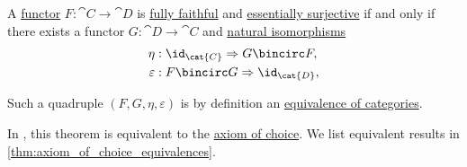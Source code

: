 \begin{theorem}\label{thm:categorical_equivalence_characterization}
  A \hyperref[def:functor]{functor} \( F: \cat{C} \to \cat{D} \) is \hyperref[def:functor_invertibility/fully_faithful]{fully faithful} and \hyperref[def:functor_invertibility/essentially_surjective]{essentially surjective} if and only if there exists a functor \( G: \cat{D} \to \cat{C} \) and \hyperref[def:natural_isomorphism]{natural isomorphisms}
  \begin{align*}
    \eta        &: \id_{\cat{C}} \Rightarrow G \bincirc F, \\
    \varepsilon &: F \bincirc G \Rightarrow \id_{\cat{D}},
  \end{align*}
\end{theorem}
\begin{comments}
  \item Such a quadruple \( (F, G, \eta, \varepsilon) \) is by definition an \hyperref[def:equivalence_of_categories]{equivalence of categories}.

  \item In \hyperref[def:zfc]{}, this theorem is equivalent to the \hyperref[def:zfc/choice]{axiom of choice}. We list equivalent results in \cref{thm:axiom_of_choice_equivalences}.
\end{comments}
